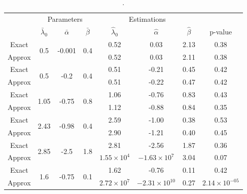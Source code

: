 \begin{table}[!ht]
\centering
\begin{tabular}{cccc|ccc|c}
\hline
    & \multicolumn{3}{c}{Parameters} & \multicolumn{3}{c}{Estimations} & \\
   & $\bar \lambda_0$ &  $\bar \alpha$ &  $\bar \beta$ & $\hat \lambda_0$ &  $\hat \alpha$ &  $\hat \beta$ &  p-value \\
\hline
       Exact&\multirow{2}{*}{0.5 } & \multirow{2}{*}{-0.001 } & \multirow{2}{*}{0.4} &       0.52 & 0.03 & 2.13 & 0.38\\
       Approx&      &       &       & 0.52 & 0.03 & 2.11 & 0.38\\ \hline
       Exact&\multirow{2}{*}{0.5 } & \multirow{2}{*}{-0.2 } & \multirow{2}{*}{0.4 } &       0.51 & -0.21 & 0.45  & 0.42    \\
       Approx&      &       &       &0.51 & -0.22 & 0.47 & 0.42\\ \hline
       Exact&\multirow{2}{*}{1.05 } & \multirow{2}{*}{-0.75 } & \multirow{2}{*}{0.8 } &       1.06 & -0.76 & 0.83 & 0.43  \\
       Approx&      &       &       &1.12 & -0.88 & 0.84 & 0.35\\ \hline
       Exact&\multirow{2}{*}{2.43 } & \multirow{2}{*}{-0.98 } & \multirow{2}{*}{0.4} &       2.59 & -1.00 & 0.38 & 0.53  \\
       Approx&      &       &       & 2.90 & -1.21 & 0.40 & 0.45 \\ \hline
       Exact&\multirow{2}{*}{2.85 } & \multirow{2}{*}{-2.5 } & \multirow{2}{*}{1.8} &       2.81 & -2.56 & 1.87 & 0.36\\
       Approx&      &       &       &$1.55\times10^{4}$ & $-1.63\times10^{7}$ & 3.04  & 0.07\\ \hline
       Exact&\multirow{2}{*}{1.6 } & \multirow{2}{*}{-0.75 } & \multirow{2}{*}{0.1} &       1.62 & -0.76 & 0.11 & 0.42   \\
       Approx&      &       &       &$2.72\times10^{7} $& $-2.31\times10^{10}$  & 0.27  & $2.14\times10^{-05}$\\
\hline
\end{tabular}
\caption{
.
}
\label{table:chap1_estim_pvalue}
\end{table}

